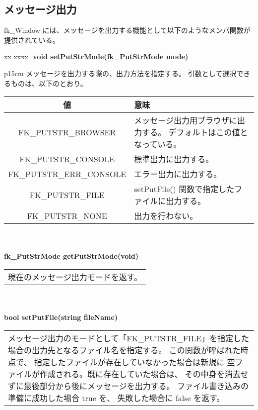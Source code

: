 \subsection{メッセージ出力} \label{sec:winmessage}
fk\_Window には、メッセージを出力する機能として以下のようなメンバ関数が
提供されている。
\begin{tabbing}
xx \= xxxx \= \kill
\> \textbf{void setPutStrMode(fk\_PutStrMode mode)} \\
	\> \> \begin{tabular}{p{15cm}}
		メッセージを出力する際の、出力方法を指定する。
		引数として選択できるものは、以下のとおり。
		\begin{center}
		\begin{tabular}{|c|p{8cm}|}
		\hline
		値 & 意味 \\ \hline
		FK\_PUTSTR\_BROWSER &
			メッセージ出力用ブラウザに出力する。
			デフォルトはこの値となっている。\\ \hline
		FK\_PUTSTR\_CONSOLE &
			標準出力に出力する。\\ \hline
		FK\_PUTSTR\_ERR\_CONSOLE &
			エラー出力に出力する。\\ \hline
		FK\_PUTSTR\_FILE &
			setPutFile() 関数で指定したファイルに出力する。\\ \hline
		FK\_PUTSTR\_NONE &
			出力を行わない。\\ \hline
		\end{tabular}
		\end{center}
	\end{tabular} \\ \\
\> \textbf{fk\_PutStrMode getPutStrMode(void)} \\
	\> \> \begin{tabular}{p{15cm}}
		現在のメッセージ出力モードを返す。
	\end{tabular} \\ \\

\> \textbf{bool setPutFile(string fileName)} \\
	\> \> \begin{tabular}{p{15cm}}
		メッセージ出力のモードとして「FK\_PUTSTR\_FILE」を指定した
		場合の出力先となるファイル名を指定する。
		この関数が呼ばれた時点で、
		指定したファイルが存在していなかった場合は新規に
		空ファイルが作成される。既に存在していた場合は、
		その中身を消去せずに最後部分から後にメッセージを出力する。
		ファイル書き込みの準備に成功した場合 true を、
		失敗した場合に false を返す。
	\end{tabular} \\ \\


\end{tabbing}
